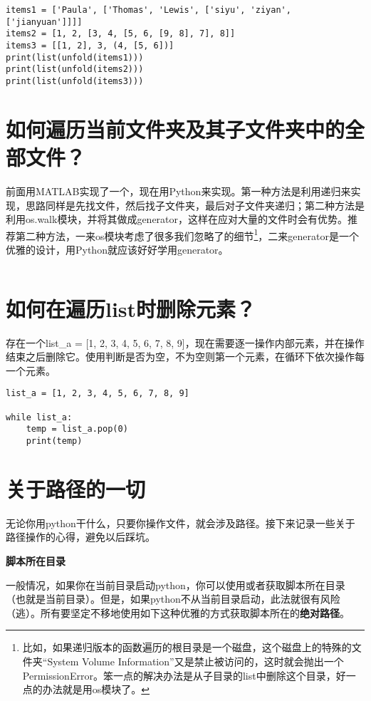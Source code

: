 \begin{verbatim}
items1 = ['Paula', ['Thomas', 'Lewis', ['siyu', 'ziyan', ['jianyuan']]]]
items2 = [1, 2, [3, 4, [5, 6, [9, 8], 7], 8]]
items3 = [[1, 2], 3, (4, [5, 6])]
print(list(unfold(items1)))
print(list(unfold(items2)))
print(list(unfold(items3)))
\end{verbatim}

\section{如何遍历当前文件夹及其子文件夹中的全部文件？}

前面用MATLAB实现了一个，现在用Python来实现。第一种方法是利用递归来实现，思路同样是先找文件，然后找子文件夹，最后对子文件夹递归；第二种方法是利用os.walk模块，并将其做成generator，这样在应对大量的文件时会有优势。推荐第二种方法，一来os模块考虑了很多我们忽略了的细节\footnote{比如，如果递归版本的函数遍历的根目录是一个磁盘，这个磁盘上的特殊的文件夹“System Volume Information”又是禁止被访问的，这时就会抛出一个PermissionError。笨一点的解决办法是从子目录的list中删除这个目录，好一点的办法就是用os模块了。}，二来generator是一个优雅的设计，用Python就应该好好学用generator。

\inputminted{python}{code/python/get_all_file_name.py}

\section{如何在遍历list时删除元素？}

存在一个list\_a = [1, 2, 3, 4, 5, 6, 7, 8, 9]，现在需要逐一操作内部元素，并在操作结束之后删除它。使用判断是否为空，不为空则第一个元素，在循环下依次操作每一个元素。

\begin{verbatim}
list_a = [1, 2, 3, 4, 5, 6, 7, 8, 9]

while list_a:
    temp = list_a.pop(0)
    print(temp)
\end{verbatim}

\section{关于路径的一切}

无论你用python干什么，只要你操作文件，就会涉及路径。接下来记录一些关于路径操作的心得，避免以后踩坑。

\textbf{脚本所在目录}

一般情况，如果你在当前目录启动python，你可以使用或者获取脚本所在目录（也就是当前目录）。但是，如果python不从当前目录启动，此法就很有风险（逃）。所有要坚定不移地使用如下这种优雅的方式获取脚本所在的\textbf{绝对路径}。

